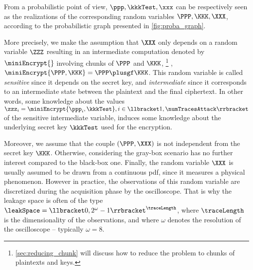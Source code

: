 From a probabilistic point of view, \(\ppp, \kkkTest, \xxx\) can be respectively seen as the realizations of the corresponding random variables \(\PPP, \KKK, \XXX\), according to the probabilistic graph presented in \autoref{fig:proba_graph}.

More precisely, we make the assumption that \(\XXX\) only depends on a random variable \(\ZZZ\) resulting in an intermediate computation denoted by \(\miniEncrypt{}\) involving chunks of \(\PPP\) and \(\KKK\),%
\footnote{
    \autoref{sec:reducing_chunk} will discuss how to reduce the problem to chunks of plaintexts and keys.
}
\eg{}, \(\miniEncrypt{\PPP, \KKK} = \PPP \plusgf \KKK\).
This random variable is called \emph{sensitive} since it depends on the secret key, and \emph{intermediate} since it corresponds to an intermediate state between the plaintext and the final ciphertext.
In other words, some knowledge about the values \(\zzz_i = \miniEncrypt{\ppp_i, \kkkTest}, i \in \llbracket 1, \numTracesAttack \rrbracket\) of the sensitive intermediate variable, induces some knowledge about the underlying secret key \(\kkkTest\) used for the encryption.

Moreover, we assume that the couple \((\PPP, \XXX)\) is not independent from the secret key \(\KKK\).
Otherwise, considering the gray-box scenario has no further interest compared to the black-box one.
Finally, the random variable \(\XXX\) is usually assumed to be drawn from a continuous \gls{pdf}, since it measures a physical phenomenon.
However in practice, the observations of this random variable are discretized during the acquisition phase by the oscilloscope.
That is why the leakage space is often of the type \(\leakSpace = \llbracket 0, 2^\omega-1 \rrbracket^\traceLength\), where \(\traceLength\) is the dimensionality of the observations, and where \(\omega\) denotes the resolution of the oscilloscope -- typically \(\omega=8\).

